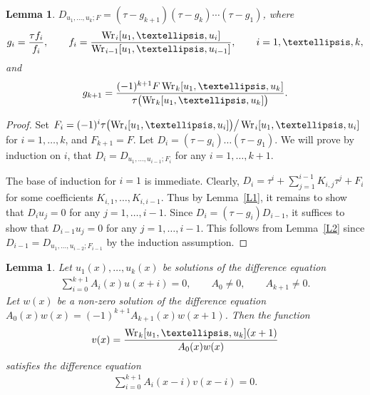 \documentclass[11pt]{article}
\numberwithin{equation}{section}
\newtheorem{lem}[thm]{Lemma}
 { \theoremstyle{definition}
\newtheorem{Remark}[thm]{Remark} }
\def\lc{,\allowbreak\ldots,\allowbreak}
\def\Wr{\mathop{\mathrm{Wr\vrule height0pt width.6pt}}\nolimits}
\begin{document}
\begin{lem} \label{L3}$ D_{u_1\lc u_k; F}=(\tau-g_{k+1}) (\tau-g_k) \cdots (\tau-g_1)$, where
\begin{gather*}
g_i = \frac{\tau f_i}{f_i},\qquad f_i = \frac{\Wr_i[u_1\lc u_i]}{\Wr_{i-1}[u_1\lc u_{i-1}]},
\qquad i=1\lc k,
\end{gather*}
and
\begin{gather*}
g_{k+1} = \frac{(-1)^{k+1}F\Wr_k[u_1\lc u_k]}
{\tau\bigl(\Wr_k[u_1\lc u_k]\bigr)}.
\end{gather*}
\end{lem}
\begin{proof}Set $F_i=(-1)^i \tau\bigl(\Wr_i[u_1\lc u_i]\bigr)\big/ \Wr_i[u_1\lc u_i]$ for $i=1\lc k$, and $F_{k+1}=F$. Let $D_i=(\tau-g_i) \dots (\tau-g_1)$. We will prove by induction on $i$, that $D_i=D_{u_1\lc u_{i-1}; F_i}$ for any $i=1\lc k+1$.

The base of induction for $i=1$ is immediate. Clearly, $D_i=\tau^i+\sum\limits_{j=1}^{i-1} K_{i,j} \tau^j+F_i$ for some coefficients $K_{i,1}\lc K_{i,i-1}$. Thus by Lemma~\ref{L1}, it remains to show that $D_iu_j=0$ for any $j=1\lc i-1$. Since $D_i=(\tau-g_i) D_{i-1}$, it suffices to show that $D_{i-1}u_j=0$ for any $j=1\lc i-1$. This follows from Lemma~\ref{L2} since $D_{i-1}=D_{u_1\lc u_{i-2}; F_{i-1}}$ by the induction assumption.
\end{proof}

\begin{lem}\label{L4} Let $u_1(x)\lc u_k(x)$ be solutions of the difference equation
\begin{gather}
\sum_{i=0}^{k+1} A_i(x) u(x+i) = 0,\qquad A_0\ne 0,\qquad A_{k+1}\ne 0.\label{e2}
\end{gather}
Let $w(x)$ be a non-zero solution of the difference equation $A_0(x) w(x)=(-1)^{k+1}A_{k+1}(x) w(x+1)$. Then the function
\begin{gather*}
v(x) = \frac{\Wr_k[u_1\lc u_k](x+1)}{A_0(x) w(x)}%
\end{gather*}
satisfies the difference equation
\begin{gather}
\sum_{i=0}^{k+1} A_i(x-i) v(x-i) = 0.\label{e4}
\end{gather}
\end{lem}
\end{document}
